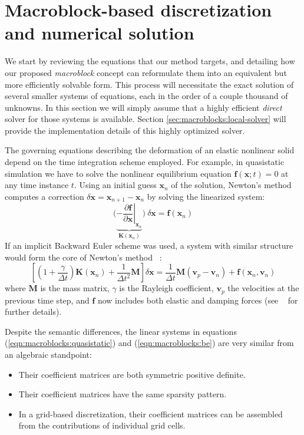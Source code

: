 \section{Macroblock-based discretization and numerical solution}
\label{sec:macroblocks:discretization}

We start by reviewing the equations that our method targets, and
detailing how our proposed \emph{macroblock} concept can reformulate
them into an equivalent but more efficiently solvable form. This
process will necessitate the exact solution of several smaller systems
of equations, each in the order of a couple thousand of unknowns. In
this section we will simply assume that a highly efficient
\emph{direct} solver for those systems is available. Section
\ref{sec:macroblocks:local-solver} will provide the implementation details of this
highly optimized solver.

The governing equations describing the deformation of an elastic
nonlinear solid depend on the time integration scheme employed. For
example, in quasistatic simulation we have to solve the nonlinear
equilibrium equation $\mathbf{f}(\mathbf{x};t)=0$ at any time instance
$t$. Using an initial guess $\mathbf{x}_n$ of the solution,
Newton's method computes a correction
$\delta\mathbf{x}=\mathbf{x}_{n+1}\!\!-\!\mathbf{x}_n$ by
solving the linearized system:
\begin{equation}
  \bigg(
\underbrace{\left.
-\frac{\partial\mathbf{f}}{\partial\mathbf{x}}
\right|_{\mathbf{x}_n}
}_{\mathbf{K}(\mathbf{x}_n)}
\bigg) \ 
\delta\mathbf{x}=\mathbf{f}(\mathbf{x}_n)
\label{eqn:macroblocks:quasistatic}
\end{equation}
If an implicit Backward Euler scheme was used, a system with similar
structure would form the core of Newton's method ~\citep{SifakB:2012}:
\begin{equation}
\left[(1\!\!+\!\!\frac{\gamma}{\Delta t})\mathbf{K}(\mathbf{x}_n)\!+\!\frac{1}{\Delta t^2}\mathbf{M}\right]
\delta\mathbf{x}=\frac{1}{\Delta t}\mathbf{M}(\mathbf{v}_p\!\!-\!\mathbf{v}_n)+\mathbf{f}(\mathbf{x}_n,\mathbf{v}_n)
\label{eqn:macroblocks:be}
\end{equation}
where $\mathbf{M}$ is the mass matrix, $\gamma$ is the Rayleigh
coefficient, $\mathbf{v}_p$ the velocities at the previous time step,
and $\mathbf{f}$ now includes both elastic and damping forces (see
~\citep{SifakB:2012} for further details).

Despite the semantic differences, the linear systems in equations
(\ref{eqn:macroblocks:quasistatic}) and (\ref{eqn:macroblocks:be}) are very similar from an
algebraic standpoint:
\begin{itemize}
\item{Their coefficient matrices are both symmetric positive definite.}
\item{Their coefficient matrices have the same sparsity pattern.}
\item{In a grid-based discretization, their coefficient matrices can
    be assembled from the contributions of individual grid cells.}
\end{itemize}

